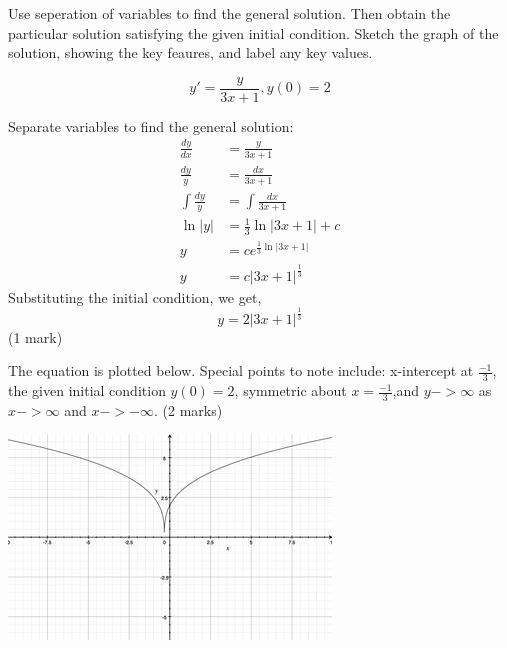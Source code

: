 \documentclass{article}
\begin{document}
Use seperation of variables to find the general solution. Then
obtain the particular solution satisfying the given initial condition.
Sketch the graph of the solution, showing the key feaures, and label any
key values.

$$y' = \frac{y}{3x+1}, y(0) = 2$$

\noindent
Separate variables to find the general solution:
\begin{align*}
\frac{dy}{dx} &= \frac{y}{3x+1}
\\ \frac{dy}{y} &= \frac{dx}{3x+1}
\\ \int \frac{dy}{y} &= \int \frac{dx}{3x+1}
\\ \ln \left|y\right| &= \frac{1}{3} \ln \left|3x+1\right| + c
\\ y &= ce^{\frac{1}{3} \ln \left|3x+1\right|}
\\ y &= c \left|3x+1\right|^{\frac{1}{3}} \tag{2 marks}
\end {align*}
Substituting the initial condition, we get,
$$y = 2\left|3x+1\right|^{\frac{1}{3}}$$ \hfill (1 mark)

\noindent
The equation is plotted below. Special points to note include: x-intercept at $\frac{-1}{3}$, the given initial condition $y(0) = 2$, symmetric about $x=\frac{-1}{3}$,and $y->\infty$ as $x->\infty$ and $x->-\infty$. \hfill (2 marks)
\begin{center}
  \includegraphics[scale=0.5]{Plot}
\end{center}
\end{document}
